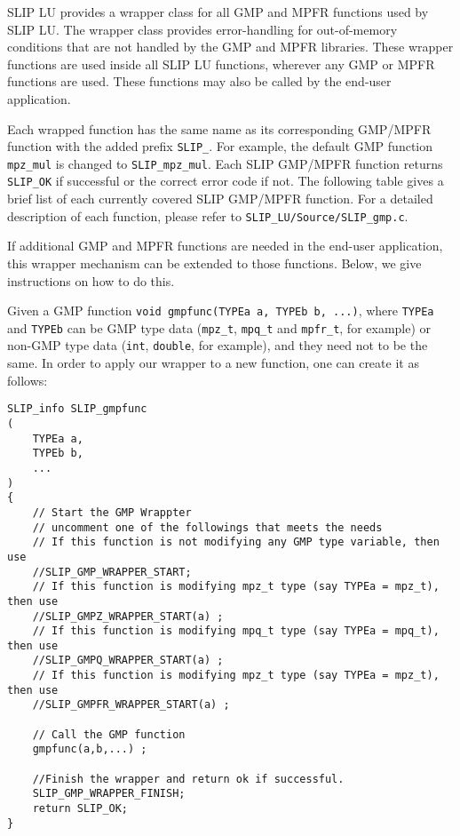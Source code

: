 \documentclass[12pt]{article}
\theoremstyle{definition}
\begin{document}
SLIP LU provides a wrapper class for all GMP and MPFR functions used by SLIP
LU.  The wrapper class provides error-handling for out-of-memory conditions
that are not handled by the GMP and MPFR libraries.  These wrapper functions
are used inside all SLIP LU functions, wherever any GMP or MPFR functions are
used.  These functions may also be called by the end-user application.

Each wrapped function has the same name as its corresponding GMP/MPFR function
with the added prefix \verb|SLIP_|. For example, the default GMP function
\verb|mpz_mul| is changed to \verb|SLIP_mpz_mul|. Each SLIP GMP/MPFR function
returns \verb|SLIP_OK| if successful or the correct error code if not. The
following table gives a brief list of each currently covered SLIP GMP/MPFR
function. For a detailed description of each function, please refer to
\verb|SLIP_LU/Source/SLIP_gmp.c|.

If additional GMP and MPFR functions are needed in the end-user application,
this wrapper mechanism can be extended to those functions.  Below, we give
instructions on how to do this.

Given a GMP function \verb|void gmpfunc(TYPEa a, TYPEb b, ...)|, where
\verb|TYPEa| and \verb|TYPEb| can be GMP type data (\verb|mpz_t|,
\verb|mpq_t| and \verb|mpfr_t|, for example) or non-GMP type data (\verb|int|,
\verb|double|, for example), and they need not to be the same. In order to
apply our wrapper to a new function, one can create it as follows:

\begin{mdframed}[userdefinedwidth=6in]
{\footnotesize
\begin{verbatim}
SLIP_info SLIP_gmpfunc
(
    TYPEa a,
    TYPEb b,
    ...
)
{
    // Start the GMP Wrappter
    // uncomment one of the followings that meets the needs
    // If this function is not modifying any GMP type variable, then use
    //SLIP_GMP_WRAPPER_START;
    // If this function is modifying mpz_t type (say TYPEa = mpz_t), then use
    //SLIP_GMPZ_WRAPPER_START(a) ;
    // If this function is modifying mpq_t type (say TYPEa = mpq_t), then use
    //SLIP_GMPQ_WRAPPER_START(a) ;
    // If this function is modifying mpz_t type (say TYPEa = mpz_t), then use
    //SLIP_GMPFR_WRAPPER_START(a) ;

    // Call the GMP function
    gmpfunc(a,b,...) ;

    //Finish the wrapper and return ok if successful.
    SLIP_GMP_WRAPPER_FINISH;
    return SLIP_OK;
}
\end{verbatim}
} \end{mdframed}
\end{document}
